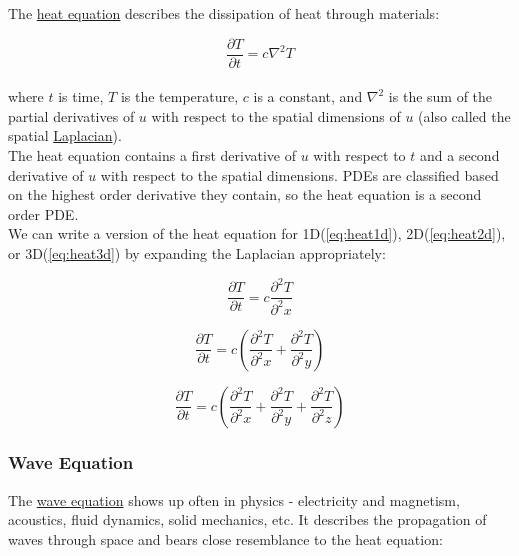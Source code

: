 {The \href{https://en.wikipedia.org/wiki/Heat_equation}{heat equation} describes the dissipation of heat through materials:

 \begin{equation}\label{eq:heatEq}
 \frac{\partial T}{\partial t} = c\nabla^{2}T
   \end{equation}
     \\
    where $t$ is time, $T$ is the temperature, $c$ is a constant, and $\nabla^{2}$ is the sum of the partial derivatives of $u$ with respect to the spatial dimensions of $u$ (also called the spatial \href{https://en.wikipedia.org/wiki/Laplace_operator}{Laplacian}).\\
    
    The heat equation contains a first derivative of $u$ with respect to $t$ and a second derivative of $u$ with respect to the spatial dimensions.  PDEs are classified based on the highest order derivative they contain, so the heat equation is a second order PDE.\\
    
     We can write a version of the heat equation for 1D(\ref{eq:heat1d}), 2D(\ref{eq:heat2d}), or 3D(\ref{eq:heat3d}) by expanding the Laplacian appropriately:
 
 \begin{equation}\label{eq:heat1d}
  \frac{\partial T}{\partial t} = c\frac{\partial^{2}T}{\partial^{2}x}
  \end{equation}
  
   \begin{equation}\label{eq:heat2d}
  \frac{\partial T}{\partial t} = c\left(\frac{\partial^{2}T}{\partial^{2}x}+\frac{\partial^{2}T}{\partial^{2}y}\right)
  \end{equation}
  
   \begin{equation}\label{eq:heat3d}
  \frac{\partial T}{ \partial t} = c\left(\frac{\partial^{2}T}{\partial^{2}x}+\frac{\partial^{2}T}{\partial^{2}y}+\frac{\partial^{2}T}{\partial^{2}z} \right)
  \end{equation}
  
\subsubsection{Wave Equation}

 The \href{https://en.wikipedia.org/wiki/Wave_equation}{wave equation} shows up often in physics - electricity and magnetism, acoustics, fluid dynamics, solid mechanics, etc.  It describes the propagation of waves through space and bears close resemblance to the heat equation:

}

